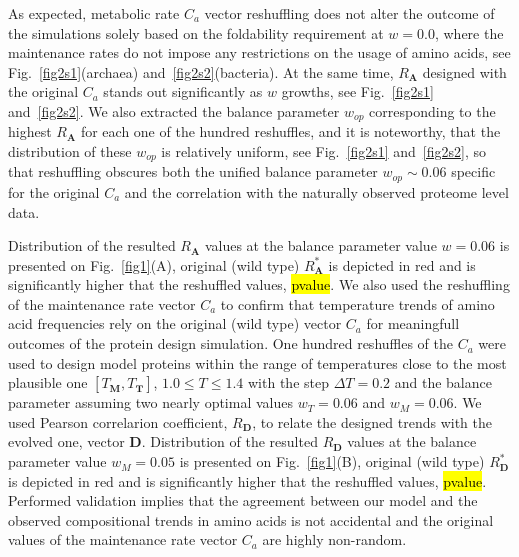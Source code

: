 \documentclass{report}
\begin{document}
As expected, metabolic rate $C_{a}$ vector reshuffling does not alter the outcome of the simulations solely based on the foldability requirement at $\mathit{w}=0.0$, where the maintenance rates do not impose any restrictions on the usage of amino acids, see Fig.~\ref{fig2s1}(archaea) and~\ref{fig2s2}(bacteria). At the same time, $R_{\mathbf{A}}$ designed with the original $C_{a}$ stands out significantly as $\mathit{w}$ growths, see Fig.~\ref{fig2s1} and~\ref{fig2s2}. We also extracted the balance parameter $\mathit{w}_{op}$ corresponding to the highest $R_{\mathbf{A}}$ for each one of the hundred reshuffles, and it is noteworthy, that the distribution of these $\mathit{w}_{op}$ is relatively uniform, see Fig.~\ref{fig2s1} and~\ref{fig2s2}, so that reshuffling obscures both the unified balance parameter $\mathit{w}_{op}\sim0.06$ specific for the original $C_{a}$ and the correlation with the naturally observed proteome level data.

Distribution of the resulted $R_{\mathbf{A}}$ values at the balance parameter value $\mathit{w}=0.06$ is presented on Fig.~\ref{fig1}(A), original (wild type) $R^{*}_{\mathbf{A}}$ is depicted in red and is significantly higher that the reshuffled values, \hl{pvalue}. We also used the reshuffling of the maintenance rate vector $C_{a}$ to confirm that temperature trends of amino acid frequencies rely on the original (wild type) vector $C_{a}$ for meaningfull outcomes of the protein design simulation. One hundred reshuffles of the $C_{a}$ were used to design model proteins within the range of temperatures close to the most plausible one $[T_\mathbf{M},T_\mathbf{T}]$, $1.0\leq T\leq1.4$ with the step $\Delta T=0.2$ and the balance parameter assuming two nearly optimal values $\mathit{w}_{T}=0.06$ and $\mathit{w}_{M}=0.06$. We used Pearson correlarion coefficient, $R_{\mathbf{D}}$, to relate the designed trends with the evolved one, vector $\mathbf{D}$. Distribution of the resulted $R_{\mathbf{D}}$ values at the balance parameter value $\mathit{w}_{M}=0.05$ is presented on Fig.~\ref{fig1}(B), original (wild type) $R^{*}_{\mathbf{D}}$ is depicted in red and is significantly higher that the reshuffled values, \hl{pvalue}. Performed validation implies that the agreement between our model and the observed compositional trends in amino acids is not accidental and the original values of the maintenance rate vector $C_{a}$ are highly non-random.
\end{document}
